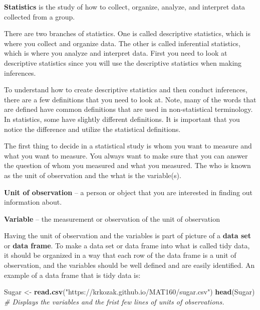 \documentclass[]{book}
\newenvironment{Shaded}{\begin{snugshade}}{\end{snugshade}}
\newcommand{\CommentTok}[1]{\textcolor[rgb]{0.56,0.35,0.01}{\textit{#1}}}
\newcommand{\KeywordTok}[1]{\textcolor[rgb]{0.13,0.29,0.53}{\textbf{#1}}}
\newcommand{\NormalTok}[1]{#1}
\newcommand{\StringTok}[1]{\textcolor[rgb]{0.31,0.60,0.02}{#1}}
\begin{document}
\textbf{Statistics} is the study of how to collect, organize, analyze, and interpret data collected from a group.

There are two branches of statistics. One is called descriptive statistics, which is where you collect and organize data. The other is called inferential statistics, which is where you analyze and interpret data. First you need to look at descriptive statistics since you will use the descriptive statistics when making inferences.

To understand how to create descriptive statistics and then conduct inferences, there are a few definitions that you need to look at. Note, many of the words that are defined have common definitions that are used in non-statistical terminology. In statistics, some have slightly different definitions. It is important that you notice the difference and utilize the statistical definitions.

The first thing to decide in a statistical study is whom you want to measure and what you want to measure. You always want to make sure that you can answer the question of whom you measured and what you measured. The who is known as the unit of observation and the what is the variable(s).

\textbf{Unit of observation} -- a person or object that you are interested in finding out information about.

\textbf{Variable} -- the measurement or observation of the unit of observation

Having the unit of observation and the variables is part of picture of a \textbf{data set} or \textbf{data frame}. To make a data set or data frame into what is called tidy data, it should be organized in a way that each row of the data frame is a unit of observation, and the variables should be well defined and are easily identified. An example of a data frame that is tidy data is:

\begin{Shaded}
\begin{Highlighting}[]
\NormalTok{Sugar <-}\StringTok{ }\KeywordTok{read.csv}\NormalTok{(}\StringTok{"https://krkozak.github.io/MAT160/sugar.csv"}\NormalTok{)}
\KeywordTok{head}\NormalTok{(Sugar) }\CommentTok{# Displays the variables and the frist few lines of units of observations.}
\end{Highlighting}
\end{Shaded}
\end{document}
